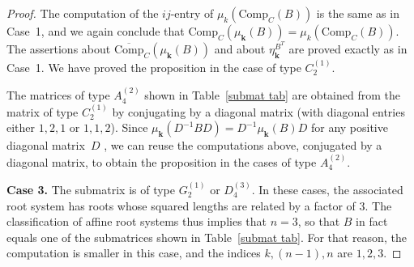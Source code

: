 \documentclass[10pt]{article}
\theoremstyle{definition}
\theoremstyle{remark}
\numberwithin{equation}{section}
\newcommand{\0}{{\mathbf{0}}}
\newcommand{\Comp}{\mathrm{Comp}_C}
\newcommand{\CompPlus}{\overline{\mathrm{Comp}}_C}
\newcommand{\kk}{{\boldsymbol{k}}}
\begin{document}
\begin{proof}
The computation of the $ij$-entry of $\mu_k(\Comp(B))$ is the same as in Case~1, and we again conclude that $\Comp(\mu_\kk(B))=\mu_k(\Comp(B))$.
The assertions about $\CompPlus(\mu_\kk(B))$ and about $\eta^{B^T}_\kk$ are proved exactly as in Case~1.
We have proved the proposition in the case of type $C_2^{(1)}$.

The matrices of type $A_4^{(2)}$ shown in Table~\ref{submat tab} are obtained from the matrix of type $C_2^{(1)}$ by conjugating by a diagonal matrix (with diagonal entries either $1,2,1$ or $1,1,2$).
Since $\mu_\kk(D^{-1}BD)=D^{-1}\mu_\kk(B)D$ for any positive diagonal matrix~$D$ \cite[Proposition~4.5]{ca1}, we can reuse the computations above, conjugated by a diagonal matrix, to obtain the proposition in the cases of type $A_4^{(2)}$.

\medskip

\noindent
\textbf{Case 3.}
The submatrix is of type  $G_2^{(1)}$ or $D_4^{(3)}$.
In these cases, the associated root system has roots whose squared lengths are related by a factor of $3$.
The classification of affine root systems thus implies that $n=3$, so that $B$ in fact equals one of the submatrices shown in Table~\ref{submat tab}.
For that reason, the computation is smaller in this case, and the indices $k,(n-1),n$ are $1,2,3$.


\end{proof}
\end{document}
